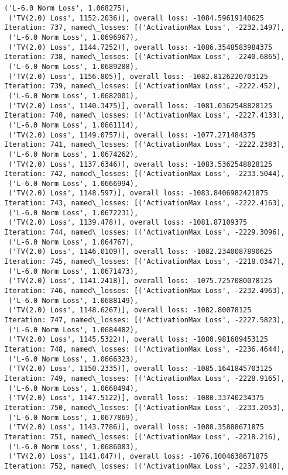 \documentclass[10pt]{article}
\begin{document}
\begin{Verbatim}[commandchars=\\\{\}]
 ('L-6.0 Norm Loss', 1.068275),
 ('TV(2.0) Loss', 1152.2036)], overall loss: -1084.59619140625
Iteration: 737, named\_losses: [('ActivationMax Loss', -2232.1497),
 ('L-6.0 Norm Loss', 1.0696967),
 ('TV(2.0) Loss', 1144.7252)], overall loss: -1086.3548583984375
Iteration: 738, named\_losses: [('ActivationMax Loss', -2240.6865),
 ('L-6.0 Norm Loss', 1.0689288),
 ('TV(2.0) Loss', 1156.805)], overall loss: -1082.8126220703125
Iteration: 739, named\_losses: [('ActivationMax Loss', -2222.452),
 ('L-6.0 Norm Loss', 1.0682001),
 ('TV(2.0) Loss', 1140.3475)], overall loss: -1081.0362548828125
Iteration: 740, named\_losses: [('ActivationMax Loss', -2227.4133),
 ('L-6.0 Norm Loss', 1.0661114),
 ('TV(2.0) Loss', 1149.0757)], overall loss: -1077.271484375
Iteration: 741, named\_losses: [('ActivationMax Loss', -2222.2383),
 ('L-6.0 Norm Loss', 1.0674262),
 ('TV(2.0) Loss', 1137.6346)], overall loss: -1083.5362548828125
Iteration: 742, named\_losses: [('ActivationMax Loss', -2233.5044),
 ('L-6.0 Norm Loss', 1.0666994),
 ('TV(2.0) Loss', 1148.597)], overall loss: -1083.8406982421875
Iteration: 743, named\_losses: [('ActivationMax Loss', -2222.4163),
 ('L-6.0 Norm Loss', 1.0672231),
 ('TV(2.0) Loss', 1139.478)], overall loss: -1081.87109375
Iteration: 744, named\_losses: [('ActivationMax Loss', -2229.3096),
 ('L-6.0 Norm Loss', 1.064767),
 ('TV(2.0) Loss', 1146.0109)], overall loss: -1082.2340087890625
Iteration: 745, named\_losses: [('ActivationMax Loss', -2218.0347),
 ('L-6.0 Norm Loss', 1.0671473),
 ('TV(2.0) Loss', 1141.2418)], overall loss: -1075.7257080078125
Iteration: 746, named\_losses: [('ActivationMax Loss', -2232.4963),
 ('L-6.0 Norm Loss', 1.0688149),
 ('TV(2.0) Loss', 1148.6267)], overall loss: -1082.80078125
Iteration: 747, named\_losses: [('ActivationMax Loss', -2227.5823),
 ('L-6.0 Norm Loss', 1.0684482),
 ('TV(2.0) Loss', 1145.5322)], overall loss: -1080.981689453125
Iteration: 748, named\_losses: [('ActivationMax Loss', -2236.4644),
 ('L-6.0 Norm Loss', 1.0666323),
 ('TV(2.0) Loss', 1150.2335)], overall loss: -1085.1641845703125
Iteration: 749, named\_losses: [('ActivationMax Loss', -2228.9165),
 ('L-6.0 Norm Loss', 1.0668494),
 ('TV(2.0) Loss', 1147.5122)], overall loss: -1080.33740234375
Iteration: 750, named\_losses: [('ActivationMax Loss', -2233.2053),
 ('L-6.0 Norm Loss', 1.0677869),
 ('TV(2.0) Loss', 1143.7786)], overall loss: -1088.35888671875
Iteration: 751, named\_losses: [('ActivationMax Loss', -2218.216),
 ('L-6.0 Norm Loss', 1.0686083),
 ('TV(2.0) Loss', 1141.047)], overall loss: -1076.1004638671875
Iteration: 752, named\_losses: [('ActivationMax Loss', -2237.9148),

\end{Verbatim}
\end{document}
